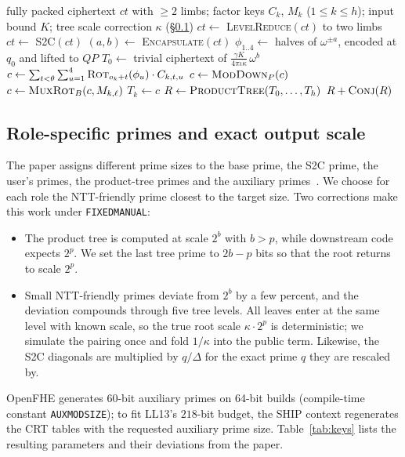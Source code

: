 \documentclass[sigconf,nonacm]{acmart}
\begin{document}
\begin{algorithm}[t]
\caption{\texttt{EvalSHIPBootstrap} for real messages}
\label{alg:ship}
\small
\begin{algorithmic}[1]
\Require fully packed ciphertext $ct$ with $\ge 2$ limbs; factor keys $C_k$, $M_k$ ($1\le k\le h$); input bound $K$; tree scale correction $\kappa$ (\S\ref{sec:primes})
\State $ct \gets$ \textsc{LevelReduce}$(ct)$ to two limbs
\State $ct \gets$ \textsc{S2C}$(ct)$ 
\State $(a,b) \gets$ \textsc{Encapsulate}$(ct)$ 
\State $\phi_{1..4} \gets$ halves of $\omega^{\pm a}$, encoded at $q_0$ and lifted to $QP$
\State $T_0 \gets$ trivial ciphertext of $\frac{\gamma K}{4\pi\iota\kappa}\,\omega^{b}$
  \State $c \gets \sum_{t<\theta}\sum_{u=1}^{4} \textsc{Rot}_{o_k+t}(\phi_u)\cdot C_{k,t,u}$ 
  \State $c \gets \textsc{ModDown}_P(c)$ 
    \State $c \gets \textsc{MuxRot}_B(c, M_{k,\ell})$ 
  \EndFor
  \State $T_k \gets c$
\EndFor
\State $R \gets \textsc{ProductTree}(T_0,\dots,T_h)$ 
\State \Return $R + \textsc{Conj}(R)$
\end{algorithmic}
\end{algorithm}

\subsection{Role-specific primes and exact output scale}
\label{sec:primes}
The paper assigns different prime sizes to the base prime, the S2C prime, the user's primes, the product-tree primes and the auxiliary primes~\cite[Table~2]{CHKS25}.
We choose for each role the NTT-friendly prime closest to the target size.
Two corrections make this work under \texttt{FIXEDMANUAL}:
\begin{itemize}
\item The product tree is computed at scale $2^{b}$ with $b>p$, while downstream code expects $2^{p}$. We set the last tree prime to $2b-p$ bits so that the root returns to scale $2^p$.
\item Small NTT-friendly primes deviate from $2^b$ by a few percent, and the deviation compounds through five tree levels. All leaves enter at the same level with known scale, so the true root scale $\kappa\cdot 2^p$ is deterministic; we simulate the pairing once and fold $1/\kappa$ into the public term. Likewise, the S2C diagonals are multiplied by $q/\Delta$ for the exact prime $q$ they are rescaled by.
\end{itemize}
OpenFHE generates $60$-bit auxiliary primes on 64-bit builds (compile-time constant \texttt{AUXMODSIZE}); to fit LL13's $218$-bit budget, the SHIP context regenerates the CRT tables with the requested auxiliary prime size.
Table~\ref{tab:keys} lists the resulting parameters and their deviations from the paper.
\end{document}
